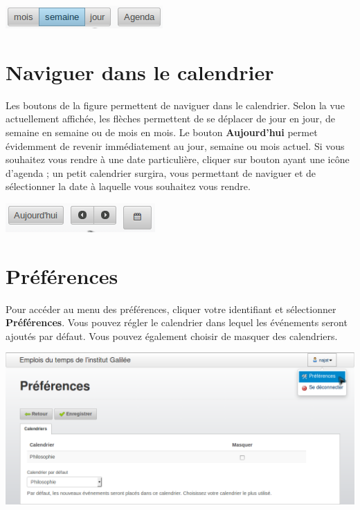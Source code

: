 \documentclass[a4paper, 11pt]{report}
\begin{document}
			\begin{center}
				\includegraphics[scale = 1]{afficher_differentes_vues}
			\end{center}
		\section{Naviguer dans le calendrier}
			Les boutons de la figure permettent de naviguer dans le calendrier. Selon la vue actuellement affichée, les flèches permettent de se déplacer de jour en jour, de semaine en semaine ou de mois en mois. Le bouton \textbf{Aujourd’hui} permet évidemment de revenir immédiatement au jour, semaine ou mois actuel. Si vous souhaitez vous rendre à une date particulière, cliquer sur bouton ayant une icône d’agenda ; un petit calendrier surgira, vous permettant de naviguer et de sélectionner la date à laquelle vous souhaitez vous rendre.

			\begin{center}
				\includegraphics[scale = 1]{naviguer_dans_calendrier.png}
			\end{center}
		\section{Préférences}
			Pour accéder au menu des préférences, cliquer votre identifiant et sélectionner \textbf{Préférences}. Vous pouvez régler le calendrier dans lequel les événements seront ajoutés par défaut. Vous pouvez également choisir de masquer des calendriers.

			\begin{center}
				\includegraphics[scale = 0.45]{preferences.png}
			\end{center}
\end{document}
